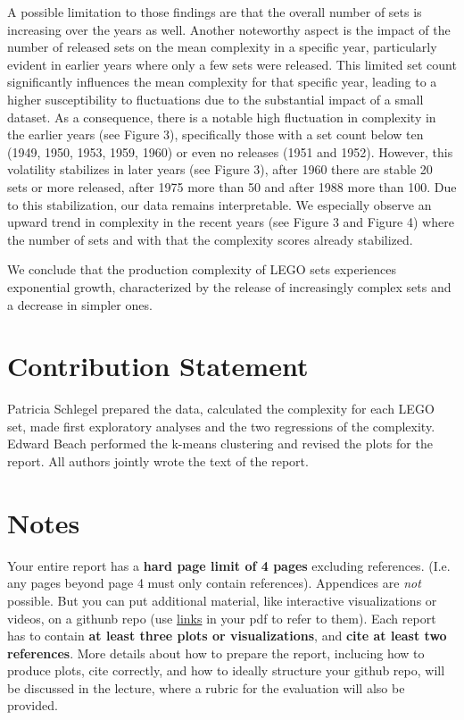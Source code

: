 \documentclass{article}
\theoremstyle{plain}
\theoremstyle{definition}
\theoremstyle{remark}
\begin{document}
A possible limitation to those findings are that the overall number of sets is increasing over the years as well. Another noteworthy aspect is the impact of the number of released sets on the mean complexity in a specific year, particularly evident in earlier years where only a few sets were released. This limited set count significantly influences the mean complexity for that specific year, leading to a higher susceptibility to fluctuations due to the substantial impact of a small dataset. As a consequence, there is a notable high fluctuation in complexity in the earlier years (see Figure 3), specifically those with a set count below ten (1949, 1950, 1953, 1959, 1960) or even no releases (1951 and 1952). However, this volatility stabilizes in later years (see Figure 3), after 1960 there are stable 20 sets or more released, after 1975 more than 50 and after 1988 more than 100. Due to this stabilization, our data remains interpretable. We especially observe an upward trend in complexity in the recent years (see Figure 3 and Figure 4) where the number of sets and with that the complexity scores already stabilized. 

We conclude that the production complexity of LEGO sets experiences exponential growth, characterized by the release of increasingly complex sets and a decrease in simpler ones.

\section*{Contribution Statement}

Patricia Schlegel prepared the data, calculated the complexity for each LEGO set, made first exploratory analyses and the two regressions of the complexity. Edward Beach performed the k-means clustering and revised the plots for the report. All authors jointly wrote the text of the report.

\section*{Notes} 

Your entire report has a \textbf{hard page limit of 4 pages} excluding references. (I.e. any pages beyond page 4 must only contain references). Appendices are \emph{not} possible. But you can put additional material, like interactive visualizations or videos, on a githunb repo (use \href{https://github.com/pnkraemer/tueplots}{links} in your pdf to refer to them). Each report has to contain \textbf{at least three plots or visualizations}, and \textbf{cite at least two references}. More details about how to prepare the report, inclucing how to produce plots, cite correctly, and how to ideally structure your github repo, will be discussed in the lecture, where a rubric for the evaluation will also be provided.




\end{document}
